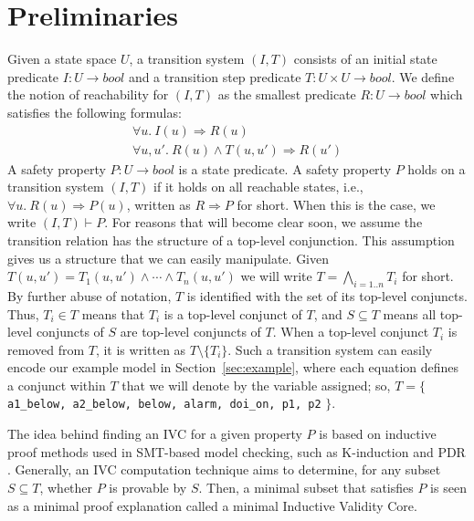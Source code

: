 \section{Preliminaries}
\label{sec:background}

\newcommand{\bool}[0]{\mathit{bool}}
\newcommand{\reach}[0]{\mathit{R}}
\newcommand{\ite}[3]{\mathit{if}\ {#1}\ \mathit{then}\ {#2}\ \mathit{else}\ {#3}}

Given a state space $U$, a transition system $(I,T)$ consists of an
initial state predicate $I : U \to \bool$ and a transition step
predicate $T : U \times U \to \bool$.
We define the notion of
reachability for $(I, T)$ as the smallest predicate $\reach : U \to
\bool$ which satisfies the following formulas:
\begin{gather*}
  \forall u.~ I(u) \Rightarrow \reach(u) \\
  \forall u, u'.~ \reach(u) \land T(u, u') \Rightarrow \reach(u')
\end{gather*}
A safety property $P : U \to \bool$ is a state predicate. A safety
property $P$ holds on a transition system $(I, T)$ if it holds on all
reachable states, i.e., $\forall u.~ \reach(u) \Rightarrow P(u)$,
written as $\reach \Rightarrow P$ for short. When this is the case, we
write $(I, T)\vdash P$. For reasons that will become clear soon, we assume the transition
  relation has the structure of a top-level conjunction. This assumption gives us a structure that we can easily manipulate. Given $T(u, u') = T_1(u, u') \land \cdots \land T_n(u, u')$ we will write $T = \bigwedge_{i=1..n}T_i$ for short.
By further abuse of notation,
$T$ is identified with the set of its top-level conjuncts. Thus, $T_i \in
T$ means that $T_i$ is a top-level conjunct of $T$, and $S
\subseteq T$ means all top-level conjuncts of $S$ are top-level
conjuncts of $T$. When a top-level conjunct $T_i$ is removed from $T$, it is written as $T \setminus \{T_i\}$. Such a transition system can easily encode our example model in Section~\ref{sec:example}, where each equation defines a conjunct within $T$ that we will denote by the variable assigned; so, $T = \{$ {\small \texttt{a1\_below, a2\_below, below, alarm, doi\_on, p1, p2}} $\}$.

The idea behind finding an IVC for a given property $P$ \cite{Ghass16} is based on inductive proof methods used in SMT-based model checking, such as K-induction and PDR \cite{NFM2012:KaGaTiWh, amla2005analysis, Een2011:PDR}. Generally, an IVC computation technique aims to determine, for any subset $S \subseteq T$, whether $P$ is provable by $S$. Then, a minimal subset that satisfies $P$ is seen as a minimal proof explanation called a minimal Inductive Validity Core.

